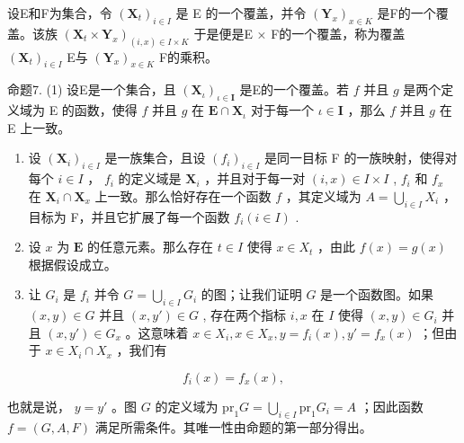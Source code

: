 设E和F为集合，令 \((\mathbf{X}_t)_{i \in I}\) 是 E 的一个覆盖，并令 \((\mathbf{Y}_x)_{x \in K}\) 是F的一个覆盖。该族 \((\mathbf{X}_t \times \mathbf{Y}_x)_{(i,x) \in I \times K}\) 于是便是E × F的一个覆盖，称为覆盖 \((\mathbf{X}_t)_{i \in I}\) E与 \((\mathbf{Y}_x)_{x \in K}\) F的乘积。

命题7. (1) 设E是一个集合，且 \((\mathbf{X}_{\iota})_{\iota \in \mathbf{I}}\) 是E的一个覆盖。若 \(f\) 并且 \(g\) 是两个定义域为 E 的函数，使得 \(f\) 并且 \(g\) 在 \(\mathbf{E} \cap \mathbf{X}_{\iota}\) 对于每一个 \(\iota \in \mathbf{I}\) ，那么 \(f\) 并且 \(g\) 在 E 上一致。

\begin{enumerate}
\def\labelenumi{(\arabic{enumi})}
\setcounter{enumi}{1}
\item
  设 \((\mathbf{X}_i)_{i \in I}\) 是一族集合，且设 \((f_i)_{i \in I}\) 是同一目标 F 的一族映射，使得对每个 \(i \in I\) ， \(f_i\) 的定义域是 \(\mathbf{X}_i\) ，并且对于每一对 \((i, x) \in I \times I\) , \(f_i\) 和 \(f_x\) 在 \(\mathbf{X}_i \cap \mathbf{X}_x\) 上一致。那么恰好存在一个函数 \(f\) ，其定义域为 \(A = \bigcup_{i \in I} X_i\) ，目标为 F，并且它扩展了每一个函数 \(f_i (i \in I)\) .
\item
  设 \(x\) 为 \(\mathbf{E}\) 的任意元素。那么存在 \(t \in I\) 使得 \(x \in X_t\) ，由此 \(f(x) = g(x)\) 根据假设成立。
\item
  让 \(G_{i}\) 是 \(f_{i}\) 并令 \(G = \bigcup_{i \in I} G_{i}\) 的图；让我们证明 \(G\) 是一个函数图。如果 \((x, y) \in G\) 并且 \((x, y') \in G\) , 存在两个指标 \(i, x\) 在 \(I\) 使得 \((x, y) \in G_{i}\) 并且 \((x, y') \in G_{x}\) 。这意味着 \(x \in X_{i}, x \in X_{x}, y = f_{i}(x), y' = f_{x}(x)\) ；但由于 \(x \in X_{i} \cap X_{x}\) ，我们有
\end{enumerate}

\[
f _ {i} (x) = f _ {x} (x),
\]

也就是说， \(y = y'\) 。图 \(G\) 的定义域为 \(\mathrm{pr}_1 G = \bigcup_{i \in I} \mathrm{pr}_1 G_i = A\) ；因此函数 \(f = (G, A, F)\) 满足所需条件。其唯一性由命题的第一部分得出。

